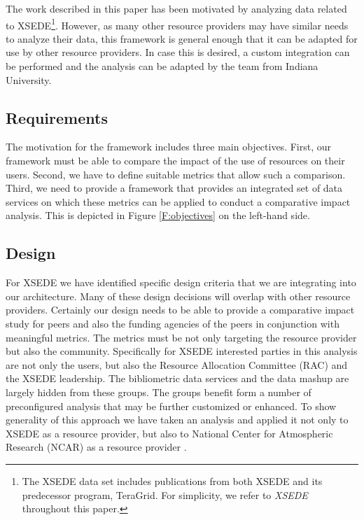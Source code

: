 \documentclass{sig-alternate}
\begin{document}
The work described in this paper has been motivated by analyzing data related to XSEDE\footnote{The XSEDE data set includes publications from both XSEDE and its predecessor program, TeraGrid. For simplicity, we refer to {\em XSEDE} throughout this paper.}. However, as many other resource providers may have similar needs to analyze their data, this framework is general enough that it can be adapted for use by other resource providers. In case this is desired, a custom integration can be performed and the analysis can be adapted by the team from Indiana University. 


\subsection{Requirements}

The motivation for the framework includes three main objectives.  First, our framework must be able to compare the impact of the use of resources on their users. Second, we have to define suitable metrics that allow such a comparison. Third, we need to provide a framework that provides an integrated set of data services on which these metrics can be applied to conduct a comparative impact analysis. This is depicted in Figure \ref{F:objectives} on the left-hand side.

\subsection{Design}


For XSEDE we have identified specific design criteria that we are integrating into our architecture. Many of these design decisions will overlap with other resource providers. Certainly our design needs to be able to provide a comparative impact study for peers and also the funding agencies of the peers in conjunction with meaningful metrics. The metrics must be not only targeting the resource provider but also the community. Specifically for XSEDE interested parties in this analysis are not only the users, but also the Resource Allocation Committee (RAC) and the XSEDE leadership. The bibliometric data services and the data mashup are largely hidden from these groups. The groups benefit form a number of preconfigured analysis that may be further customized or enhanced. To show generality of this approach we have taken an analysis and applied it not only to XSEDE as a resource provider, but also to National Center for Atmospheric Research (NCAR) as a resource provider \cite{www-ncar}.
\end{document}
